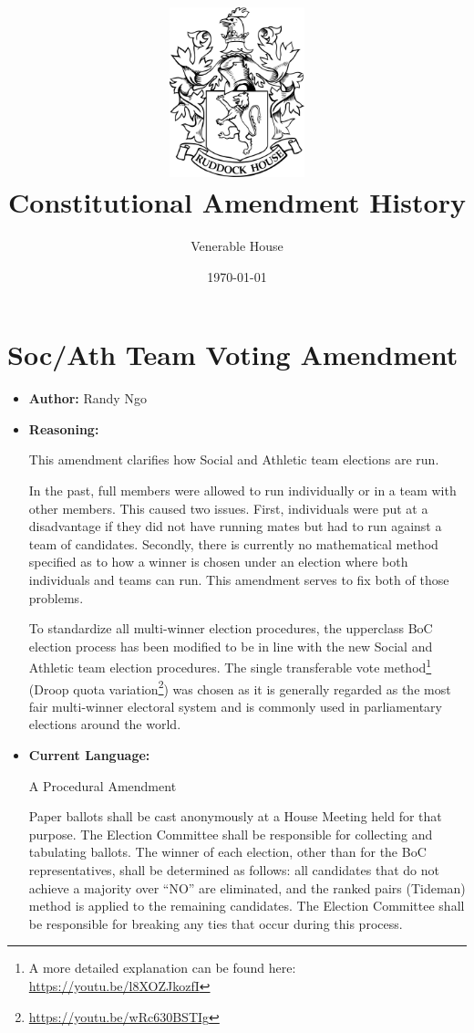 \documentclass[10pt]{article} %
\title{\includegraphics[width=1.55in]{venerable_crest.png} \\ Constitutional Amendment History}
\author{Venerable House}
\date{\today} %
\begin{document}
\maketitle

\section{Soc/Ath Team Voting Amendment}
\begin{itemize}
    \item \textbf{Author:} Randy Ngo
    \item \textbf{Reasoning:}
    
    This amendment clarifies how Social and Athletic team elections are run.

    In the past, full members were allowed to run individually or in a team with other members. This caused two issues. First, individuals were put at a disadvantage if they did not have running mates but had to run against a team of candidates. Secondly, there is currently no mathematical method specified as to how a winner is chosen under an election where both individuals and teams can run. This amendment serves to fix both of those problems.

    To standardize all multi-winner election procedures, the upperclass BoC election process has been modified to be in line with the new Social and Athletic team election procedures. The single transferable vote method\footnote{A more detailed explanation can be found here: \href{https://youtu.be/l8XOZJkozfI}{https://youtu.be/l8XOZJkozfI}} (Droop quota variation\footnote{\href{https://youtu.be/wRc630BSTIg}{https://youtu.be/wRc630BSTIg}}) was chosen as it is generally regarded as the most fair multi-winner electoral system and is commonly used in parliamentary elections around the world.
    \item \textbf{Current Language:}
    
    A Procedural Amendment

    Paper ballots shall be cast anonymously at a House Meeting held for that purpose. The Election Committee shall be responsible for collecting and tabulating ballots. The winner of each election, other than for the BoC representatives, shall be determined as follows: all candidates that do not achieve a majority over ``NO'' are eliminated, and the ranked pairs (Tideman) method is applied to the remaining candidates. The Election Committee shall be responsible for breaking any ties that occur during this process.
    

\end{itemize}
\end{document}
